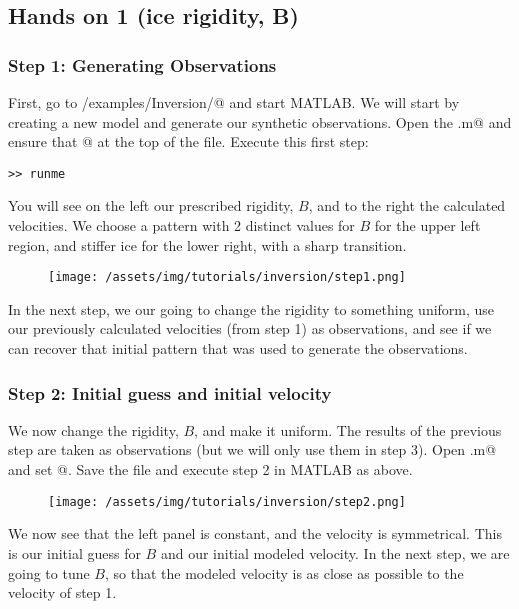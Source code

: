 \subsection{Hands on 1 (ice rigidity, B)} %
\subsubsection{Step 1: Generating Observations}
First, go to \verb@trunk/examples/Inversion/@ and start MATLAB. We will start by creating a new model and generate our synthetic observations.  Open the \verb@runme.m@ and ensure that @ at the top of the file. Execute this first step:
\begin{verbatim}>> runme\end{verbatim}
You will see on the left our prescribed rigidity, $B$, and to the right the calculated velocities. We choose a pattern with 2 distinct values for $B$ for the upper left region, and stiffer ice for the lower right, with a sharp transition.
\begin{figure}[H]
	\begin{center}
		\texttt{[image: /assets/img/tutorials/inversion/step1.png]}
	\end{center}
\end{figure}
In the next step, we our going to change the rigidity to something uniform, use our previously calculated velocities (from step 1) as observations, and see if we can recover that initial pattern that was used to generate the observations.

\subsubsection{Step 2: Initial guess and initial velocity}
We now change the rigidity, $B$, and make it uniform. The results of the previous step are taken as observations (but we will only use them in step 3). Open \verb@runme.m@ and set @. Save the file and execute step 2 in MATLAB as above.
\begin{figure}[H]
	\begin{center}
		\texttt{[image: /assets/img/tutorials/inversion/step2.png]}
	\end{center}
\end{figure}
We now see that the left panel is constant, and the velocity is symmetrical. This is our initial guess for $B$ and our initial modeled velocity. In the next step, we are going to tune $B$, so that the modeled velocity is as close as possible to the velocity of step 1.


